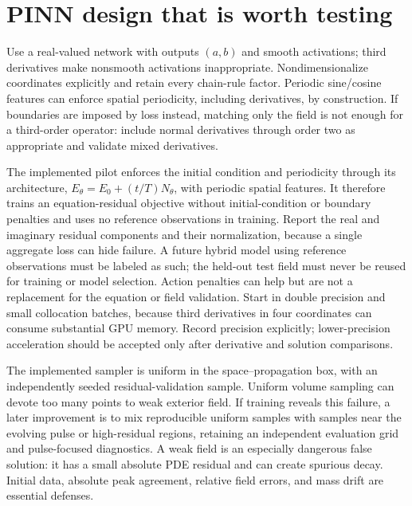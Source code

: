 \documentclass[11pt]{article}
\begin{document}
\section{PINN design that is worth testing}
Use a real-valued network with outputs $(a,b)$ and smooth activations; third derivatives make nonsmooth activations inappropriate. Nondimensionalize coordinates explicitly and retain every chain-rule factor. Periodic sine/cosine features can enforce spatial periodicity, including derivatives, by construction. If boundaries are imposed by loss instead, matching only the field is not enough for a third-order operator: include normal derivatives through order two as appropriate and validate mixed derivatives.

The implemented pilot enforces the initial condition and periodicity through its architecture, $E_\theta=E_0+(t/T)N_\theta$, with periodic spatial features. It therefore trains an equation-residual objective without initial-condition or boundary penalties and uses no reference observations in training. Report the real and imaginary residual components and their normalization, because a single aggregate loss can hide failure. A future hybrid model using reference observations must be labeled as such; the held-out test field must never be reused for training or model selection. Action penalties can help but are not a replacement for the equation or field validation. Start in double precision and small collocation batches, because third derivatives in four coordinates can consume substantial GPU memory. Record precision explicitly; lower-precision acceleration should be accepted only after derivative and solution comparisons.

The implemented sampler is uniform in the space--propagation box, with an independently seeded residual-validation sample. Uniform volume sampling can devote too many points to weak exterior field. If training reveals this failure, a later improvement is to mix reproducible uniform samples with samples near the evolving pulse or high-residual regions, retaining an independent evaluation grid and pulse-focused diagnostics. A weak field is an especially dangerous false solution: it has a small absolute PDE residual and can create spurious decay. Initial data, absolute peak agreement, relative field errors, and mass drift are essential defenses.
\end{document}
